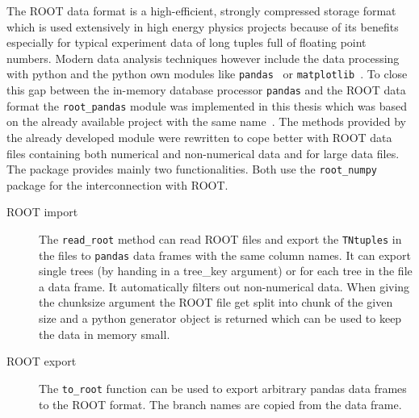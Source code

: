 The ROOT data format is a high-efficient, strongly compressed storage format which is used extensively in high energy physics projects because of its benefits especially for typical experiment data of long tuples full of floating point numbers. Modern data analysis techniques however include the data processing with python and the python own modules like \texttt{pandas}~\cite{pandas} or \texttt{matplotlib}~\cite{matplotlib}. To close this gap between the in-memory database processor \texttt{pandas} and the ROOT data format the \texttt{root\_pandas} module was implemented in this thesis which was based on the already available project with the same name~\cite{root-pandas}. The methods provided by the already developed module were rewritten to cope better with ROOT data files containing both numerical and non-numerical data and for large data files. The package provides mainly two functionalities. Both use the \texttt{root\_numpy}~\cite{root-numpy} package for the interconnection with ROOT.

\begin{description}
 \item[ROOT import] The \verb+read_root+ method can read ROOT files and export the \texttt{TNtuples} in the files to \texttt{pandas} data frames with the same column names. It can export single trees (by handing in a tree\_key argument) or for each tree in the file a data frame. It automatically filters out non-numerical data. When giving the chunksize argument the ROOT file get split into chunk of the given size and a python generator object is returned which can be used to keep the data in memory small.
 \item[ROOT export] The \verb+to_root+ function can be used to export arbitrary pandas data frames to the ROOT format. The branch names are copied from the data frame.
\end{description}
